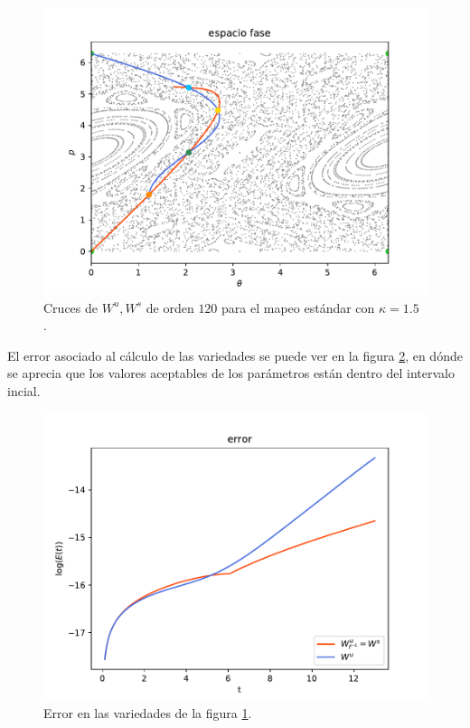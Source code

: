 \begin{figure}[H]
\centering
\includegraphics[scale=0.6]{cruce_estandar}
\caption{Cruces de $W^{u},W^{s}$ de orden $120$ para el mapeo estándar con $\kappa=1.5$ .}
\label{cruce_estandar}
\end{figure}
El error asociado al cálculo de las variedades se puede ver en la figura \ref{errorEstCruces}, en dónde se aprecia que los valores aceptables de los parámetros están dentro del intervalo incial. 

\begin{figure}[H]
\centering
\includegraphics[scale=0.6]{error_cruces_estandar}
\caption{Error en las variedades de la figura \ref{cruce_estandar}.}
\label{errorEstCruces}
\end{figure}

